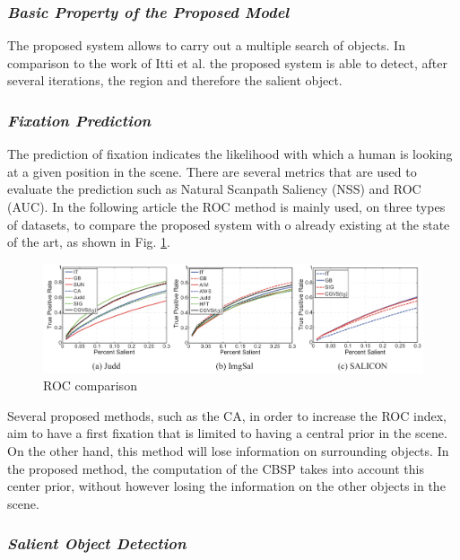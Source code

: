 \subsubsection{\emph{Basic Property of the Proposed Model}}
The proposed system allows to carry out a multiple search of objects. In 
comparison to the work of Itti et al. \cite{0747815505} the proposed system is able to detect, 
after several iterations, the region and therefore the salient object.

\subsubsection{\emph{Fixation Prediction}}
The prediction of fixation indicates the likelihood with which a human is 
looking at a given position in the scene. There are several metrics that are 
used to evaluate the prediction such as Natural Scanpath Saliency (NSS) 
and ROC (AUC). In the following article the ROC method is mainly used, 
on three types of datasets, to compare the proposed system with o already 
existing at the state of the art, as shown in Fig. \ref{fig: ROC}.
\begin{figure}[htbp]
    \centering
    \includegraphics[width = 1 \linewidth]{images/ROC.png}
    \centering
    \caption{ROC comparison}
    \label{fig: ROC}
\end{figure}

Several proposed methods, such as the CA, in order to increase the ROC 
index, aim to have a first fixation that is limited to having a central prior 
in the scene. On the other hand, this method will lose information on surrounding 
objects. In the proposed method, the computation of the CBSP 
takes into account this center prior, without however losing the information 
on the other objects in the scene.

\subsubsection{\emph{Salient Object Detection}}


